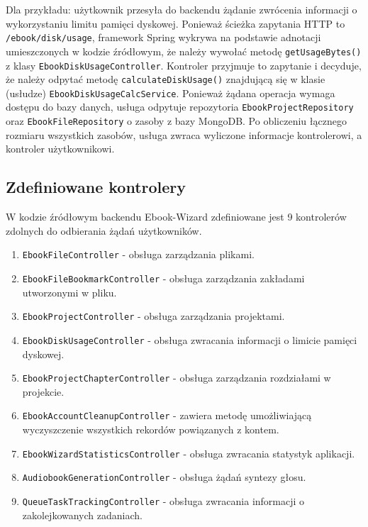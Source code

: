 Dla przykładu: użytkownik przesyła do backendu żądanie zwrócenia informacji o wykorzystaniu limitu pamięci dyskowej. Ponieważ ścieżka zapytania HTTP to \verb|/ebook/disk/usage|, framework Spring wykrywa na podstawie adnotacji umieszczonych w kodzie źródłowym, że należy wywołać metodę \verb|getUsageBytes()| z klasy \verb|EbookDiskUsageController|. Kontroler przyjmuje to zapytanie i decyduje, że należy odpytać metodę \verb|calculateDiskUsage()| znajdującą się w klasie (usłudze) \verb|EbookDiskUsageCalcService|. Ponieważ żądana operacja wymaga dostępu do bazy danych, usługa odpytuje repozytoria \verb|EbookProjectRepository| oraz \verb|EbookFileRepository| o zasoby z bazy MongoDB. Po obliczeniu łącznego rozmiaru wszystkich zasobów, usługa zwraca wyliczone informacje kontrolerowi, a kontroler użytkownikowi.

\subsection{Zdefiniowane kontrolery}

W kodzie źródłowym backendu Ebook-Wizard zdefiniowane jest 9 kontrolerów zdolnych do odbierania żądań użytkowników. 

\begin{enumerate}
    \item \verb|EbookFileController| - obsługa zarządzania plikami.
    \item \verb|EbookFileBookmarkController| - obsługa zarządzania zakładami utworzonymi w pliku.
    \item \verb|EbookProjectController| - obsługa zarządzania projektami.
    \item \verb|EbookDiskUsageController| - obsługa zwracania informacji o limicie pamięci dyskowej.
    \item \verb|EbookProjectChapterController| - obsługa zarządzania rozdziałami w projekcie.
    \item \verb|EbookAccountCleanupController| - zawiera metodę umożliwiającą wyczyszczenie wszystkich rekordów powiązanych z kontem.
    \item \verb|EbookWizardStatisticsController| - obsługa zwracania statystyk aplikacji.
    \item \verb|AudiobookGenerationController| - obsługa żądań syntezy głosu.
    \item \verb|QueueTaskTrackingController| - obsługa zwracania informacji o zakolejkowanych zadaniach.
\end{enumerate}

